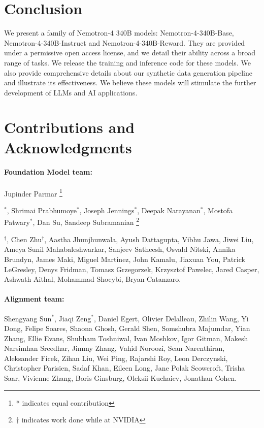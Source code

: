 \documentclass[11pt]{article}
\newcommand\blfootnote[1]{%
  \begingroup
  \renewcommand\thefootnote{}\footnote{#1}%
  \addtocounter{footnote}{-1}%
  \endgroup
}
\newcommand{\ours}{Nemotron-4-340B-Base}
\newcommand{\oursin}{Nemotron-4-340B-Instruct}
\newcommand{\oursrm}{Nemotron-4-340B-Reward}
\begin{document}


\section{Conclusion}
We present a family of Nemotron-4 340B models: \ours{}, \oursin{} and \oursrm{}.
They are provided under a permissive open access license, and we detail their ability across a broad range of tasks.
We release the training and inference code for these models.
We also provide comprehensive details about our synthetic data generation pipeline and illustrate its effectiveness.
We believe these models will stimulate the further development of LLMs and AI applications.

\section*{Contributions and Acknowledgments}


\paragraph{Foundation Model team:} 
Jupinder Parmar\blfootnote{* indicates equal contribution}$^{*}$, Shrimai Prabhumoye$^{*}$, Joseph Jennings$^{*}$, Deepak Narayanan$^{*}$, Mostofa Patwary$^{*}$, Dan Su, Sandeep Subramanian\blfootnote{$\dagger$ indicates work done while at NVIDIA}$^{\dagger}$, Chen Zhu$^{\dagger}$, Aastha Jhunjhunwala, Ayush Dattagupta, Vibhu Jawa, Jiwei Liu, Ameya Sunil Mahabaleshwarkar, Sanjeev Satheesh, Osvald Nitski, Annika Brundyn, James Maki, Miguel Martinez, John Kamalu, Jiaxuan You, Patrick LeGresley, Denys Fridman, Tomasz Grzegorzek, Krzysztof Pawelec, Jared Casper, Ashwath Aithal, Mohammad Shoeybi, Bryan Catanzaro.

\paragraph{Alignment team:}
 Shengyang Sun$^{*}$, Jiaqi Zeng$^{*}$, Daniel Egert, Olivier Delalleau, Zhilin Wang, Yi Dong, Felipe Soares, Shaona Ghosh, Gerald Shen, Somshubra Majumdar, Yian Zhang, Ellie Evans, Shubham Toshniwal, Ivan Moshkov, Igor Gitman, Makesh Narsimhan Sreedhar, Jimmy Zhang, Vahid Noroozi, Sean Narenthiran, Aleksander Ficek, Zihan Liu, Wei Ping, Rajarshi Roy, Leon Derczynski, Christopher Parisien, Sadaf Khan, Eileen Long, Jane Polak Scowcroft, Trisha Saar, Vivienne Zhang, Boris Ginsburg, Oleksii Kuchaiev, Jonathan Cohen.
\end{document}
